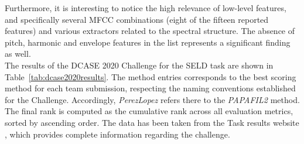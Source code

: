 Furthermore, it is interesting to notice the high relevance of low-level features, and specifically several MFCC combinations (eight of the fifteen reported features) and  various extractors related to the spectral structure. The absence of pitch, harmonic and envelope features in the list represents a significant finding as well. \\



The results of the DCASE 2020 Challenge for the SELD task are shown in Table~\ref{tab:dcase2020results}. The method entries corresponds to the best scoring method for each team submission, respecting the naming conventions established for the Challenge. Accordingly, \textit{PerezLopez} refers there to the \textit{PAPAFIL2} method. 
The final rank is computed as the cumulative rank across all evaluation metrics, sorted by ascending order. The data has been taken from the Task results website \cite{dcasetask}, which provides complete information regarding the challenge.


